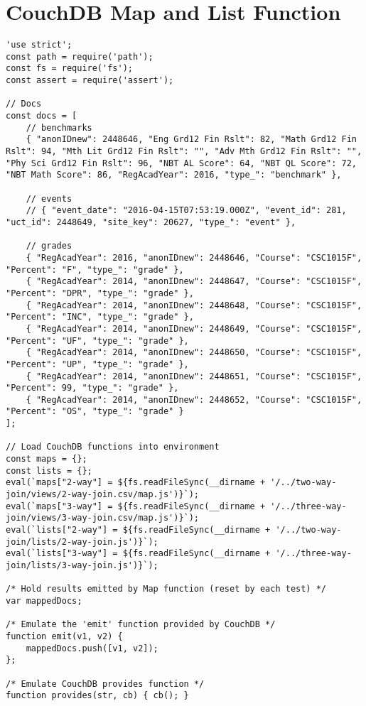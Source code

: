 \section{CouchDB Map and List Function}
\label{Map-List-tests}
\begin{verbatim}
'use strict';
const path = require('path');
const fs = require('fs');
const assert = require('assert');

// Docs
const docs = [
    // benchmarks
    { "anonIDnew": 2448646, "Eng Grd12 Fin Rslt": 82, "Math Grd12 Fin Rslt": 94, "Mth Lit Grd12 Fin Rslt": "", "Adv Mth Grd12 Fin Rslt": "", "Phy Sci Grd12 Fin Rslt": 96, "NBT AL Score": 64, "NBT QL Score": 72, "NBT Math Score": 86, "RegAcadYear": 2016, "type_": "benchmark" },

    // events
    // { "event_date": "2016-04-15T07:53:19.000Z", "event_id": 281, "uct_id": 2448649, "site_key": 20627, "type_": "event" },

    // grades
    { "RegAcadYear": 2016, "anonIDnew": 2448646, "Course": "CSC1015F", "Percent": "F", "type_": "grade" },
    { "RegAcadYear": 2014, "anonIDnew": 2448647, "Course": "CSC1015F", "Percent": "DPR", "type_": "grade" },
    { "RegAcadYear": 2014, "anonIDnew": 2448648, "Course": "CSC1015F", "Percent": "INC", "type_": "grade" },
    { "RegAcadYear": 2014, "anonIDnew": 2448649, "Course": "CSC1015F", "Percent": "UF", "type_": "grade" },
    { "RegAcadYear": 2014, "anonIDnew": 2448650, "Course": "CSC1015F", "Percent": "UP", "type_": "grade" },
    { "RegAcadYear": 2014, "anonIDnew": 2448651, "Course": "CSC1015F", "Percent": 99, "type_": "grade" },
    { "RegAcadYear": 2014, "anonIDnew": 2448652, "Course": "CSC1015F", "Percent": "OS", "type_": "grade" }
];

// Load CouchDB functions into environment
const maps = {};
const lists = {};
eval(`maps["2-way"] = ${fs.readFileSync(__dirname + '/../two-way-join/views/2-way-join.csv/map.js')}`);
eval(`maps["3-way"] = ${fs.readFileSync(__dirname + '/../three-way-join/views/3-way-join.csv/map.js')}`);
eval(`lists["2-way"] = ${fs.readFileSync(__dirname + '/../two-way-join/lists/2-way-join.js')}`);
eval(`lists["3-way"] = ${fs.readFileSync(__dirname + '/../three-way-join/lists/3-way-join.js')}`);

/* Hold results emitted by Map function (reset by each test) */
var mappedDocs;

/* Emulate the 'emit' function provided by CouchDB */
function emit(v1, v2) {
    mappedDocs.push([v1, v2]);
};

/* Emulate CouchDB provides function */
function provides(str, cb) { cb(); }


\end{verbatim}

